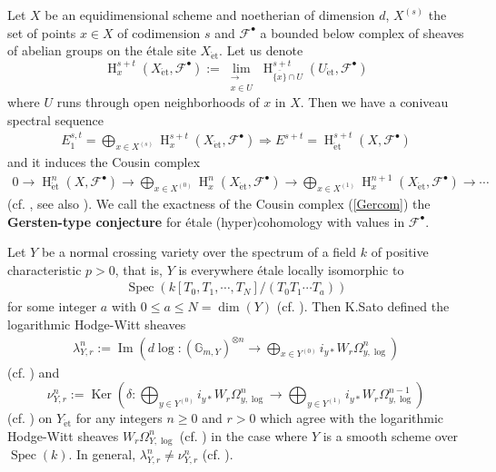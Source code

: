\documentclass{article}
\newcommand{\spec}{\operatorname{Spec}}
\newcommand{\et}{\mathrm{\acute{e}t}}
\newcommand{\HO}{\operatorname{H}}
\begin{document}
Let $X$ be an equidimensional scheme and
noetherian of dimension $d$,
$X^{(s)}$ the set of points $x\in X$ of codimension $s$
and $\mathcal{F}^{\bullet}$ a bounded below complex of sheaves of abelian groups
on 
the \'{e}tale site $X_{\et}$. 
Let us denote
%
\begin{equation*}
\HO^{s+t}_{x}(X_{\et},
\mathcal{F}^{\bullet}
)
:=
\displaystyle\lim_{\substack{
\to \\
x\in U}
}
\HO^{s+t}_{\bar{\{x\}}\cap U}(
U_{\et},
\mathcal{F}^{\bullet}
)
\end{equation*}
%
where $U$ runs through open neighborhoods of $x$ in $X$.
Then we have a coniveau spectral sequence
%
\begin{align}\label{Inconisp}
E^{s, t}_{1}
=
\displaystyle
\bigoplus_{x\in X^{(s)}}
\HO^{s+t}_{x}(
X_{\et},
\mathcal{F}^{\bullet}
)
\Rightarrow
E^{s+t}
=
\HO^{s+t}_{\et}(
X,
\mathcal{F}^{\bullet}
)
\end{align}
%
%
and it induces the Cousin complex
%
\begin{align}\label{Gercom}
0
\to 
\HO^{n}_{\et}(
X, \mathcal{F}^{\bullet}
)
\to
\displaystyle\bigoplus_{
x\in X^{(0)}
}
\HO^{n}_{x}(
X_{\et},
\mathcal{F}^{\bullet}
)
\to
\displaystyle\bigoplus_{
x\in X^{(1)}
}
\HO^{n+1}_{x}(
X_{\et},
\mathcal{F}^{\bullet}
)
\to
\cdots
\end{align}
%
(cf. \cite[Part 1, \S 1]{C-H-K}, see also \cite[Theorem 2.1]{Sak5}).
We call the exactness of the Cousin complex (\ref{Gercom}) 
the \textbf{Gersten-type conjecture}
for \'{e}tale (hyper)cohomology with values in $\mathcal{F}^{\bullet}$.

Let $Y$ be a normal crossing variety over the spectrum of a field $k$
of positive characteristic $p>0$, 
that is,
$Y$ is everywhere \'{e}tale locally isomorphic to
%
\begin{align*}
\spec(k[T_{0}, T_{1}, \cdots, T_{N}]/(T_{0}T_{1}\cdots T_{a}))    
\end{align*}
%
for some integer $a$ with $0\leq a\leq N=\operatorname{dim}(Y)$
(cf. \cite[pp.180--181, Definition 2.1]{SaR}).
Then K.Sato defined the logarithmic Hodge-Witt sheaves
%
\begin{align*}
\lambda^{n}_{Y, r}
:=
\operatorname{Im}\left(
d\log:
(\mathbb{G}_{m, Y})^{\otimes n}
\to
\displaystyle 
\bigoplus_{x\in Y^{(0)}}
i_{y *}W_{r}\Omega^{n}_{y, \log}
\right)
\end{align*}
%
(cf. \cite[p.726, Definition 3.1.1 (1)]{SaL}) and
%
\begin{equation*}
\nu^{n}_{Y, r} 
:=
\operatorname{Ker}\left(
\delta:
\displaystyle\bigoplus_{y\in Y^{(0)}}
i_{y *}W_{r}\Omega^{n}_{y, \log}
\to
\displaystyle\bigoplus_{y\in Y^{(1)}}
i_{y *}W_{r}\Omega^{n-1}_{y, \log}
\right)
\end{equation*}
%
(cf. \cite[p.715, Definition 2.1.1]{SaL}) on $Y_{\et}$ for any integers $n\geq 0$ and $r>0$ which agree with the logarithmic Hodge-Witt sheaves 
$W_{r}\Omega^{n}_{Y, \log}$ (cf. \cite{I}) 
in the case where $Y$
is a smooth scheme over $\spec(k)$.
In general, 
%
\begin{math}
\lambda^{n}_{Y, r}
\neq
\nu^{n}_{Y, r}
\end{math}
%
(cf. \cite[p.737, Remark 4.2.3]{SaL}).
\end{document}
